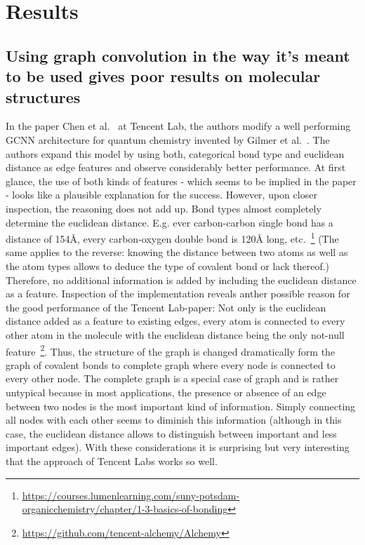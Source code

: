 \chapter{Results}
\label{chapter:Results}


\section{Using graph convolution in the way it's meant to be used gives poor results on molecular structures}
\label{sec:neighborhood-expansion}

In the paper Chen et al.~\cite{Chen2019} at Tencent Lab, the authors modify a well performing GCNN architecture for quantum chemistry invented by Gilmer et al.~\cite{Gilmer2017}. The authors expand this model by using both, categorical bond type and euclidean distance as edge features and observe considerably better performance. At first glance, the use of both kinds of features - which seems to be implied in the paper - looks like a plausible explanation for the success. However, upon closer inspection, the reasoning does not add up. Bond types almost completely determine the euclidean distance. E.g. ever carbon-carbon single bond has a distance of 154Å, every carbon-oxygen double bond is 120Å long, etc.~\footnote{\url{https://courses.lumenlearning.com/suny-potsdam-organicchemistry/chapter/1-3-basics-of-bonding}} (The same applies to the reverse: knowing the distance between two atoms as well as the atom types allows to deduce the type of covalent bond or lack thereof.) Therefore, no additional information is added by including the euclidean distance as a feature. Inspection of the implementation reveals anther possible reason for the good performance of the Tencent Lab-paper: Not only is the euclidean distance added as a feature to existing edges, every atom is connected to every other atom in the molecule with the euclidean distance being the only not-null feature~\footnote{\url{https://github.com/tencent-alchemy/Alchemy}}. Thus, the structure of the graph is changed dramatically form the graph of covalent bonds to complete graph where every node is connected to every other node. The complete graph is a special case of graph and is rather untypical because in most applications, the presence or absence of an edge between two nodes is the most important kind of information. Simply connecting all nodes with each other seems to diminish this information (although in this case, the euclidean distance allows to distinguish between important and less important edges). With these considerations it is surprising but very interesting that the approach of Tencent Labs works so well.

